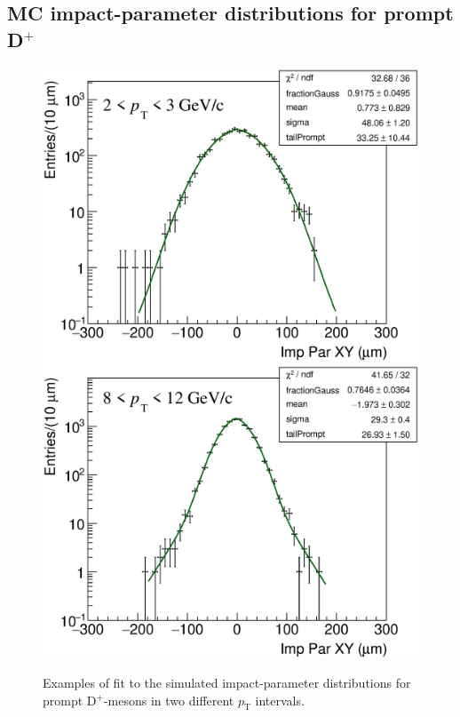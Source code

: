 \documentclass[b5paper,10pt,twoside,oldstyle,classica]{toptesi}
\newcommand{\pt}{p_\text{T}}
\begin{document}
\subsection{MC impact-parameter distributions for prompt D$^+$}
\label{prompt_prefit_sec}
\begin{figure}[tb]
\begin{center}
{\includegraphics[scale = 0.31]{ImpParPrompt_2-3.eps}}
\hspace{-0.2cm}
{\includegraphics[scale = 0.31]{ImpParPrompt_8-12.eps}}
\caption{Examples of fit to the simulated impact-parameter distributions for prompt D$^+$-mesons in two different $\pt$ intervals.}
\label{prompt_prefit}
\end{center}
\end{figure}
\end{document}
